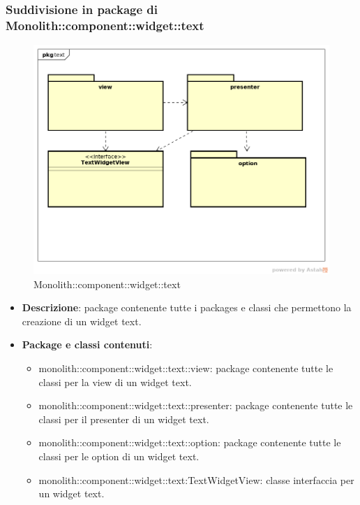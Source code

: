 \subsubsection{Suddivisione in package  di Monolith::component::widget::text}
\label{Monolith::component::widget::text}
\begin{figure}[H]
	\centering
	\includegraphics[scale=0.5]{Sezioni/imgPackage/component_widget_text.png}
	\caption{Monolith::component::widget::text}
\end{figure}
\begin{itemize}
	\item{\textbf{Descrizione}}: package contenente tutte i packages e classi che permettono la creazione di un widget text.
	\item{\textbf{Package e classi contenuti}}:
	\begin{itemize}
	\item{monolith::component::widget::text::view}: package contenente tutte le classi per la view di un widget text.
	\item{monolith::component::widget::text::presenter}: package contenente tutte le classi per il presenter di un widget text.
	\item{monolith::component::widget::text::option}: package contenente tutte le classi per le option di un widget text.
	\item{monolith::component::widget::text:TextWidgetView}: classe interfaccia per un widget text.
	\end{itemize}
	
\end{itemize}


